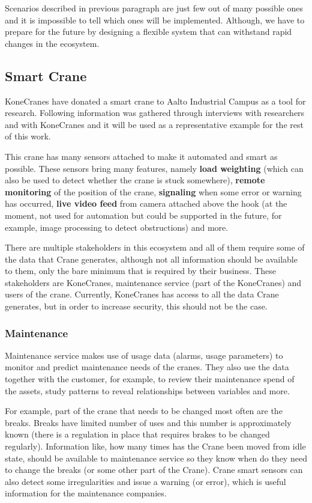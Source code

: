 Scenarios described in previous paragraph are just few out of many possible ones and it is impossible to tell which ones will be implemented. Although, we have to prepare for the future by designing a flexible system that can withstand rapid changes in the ecosystem.

\subsection{Smart Crane}

KoneCranes have donated a smart crane to Aalto Industrial Campus as a tool for research. Following information was gathered through interviews with researchers and with KoneCranes and it will be used as a representative example for the rest of this work.

This crane has many sensors attached to make it automated and smart as possible. These sensors
bring many features, namely {\bf load weighting} (which can also be used to detect
whether the crane is stuck somewhere), {\bf remote monitoring } of the position of the crane,
{\bf signaling} when some error or warning has occurred, {\bf live video feed } from camera attached
above the hook (at the moment, not used for automation but could be supported in the future,
for example, image processing to detect obstructions) and more.

There are multiple stakeholders in this ecosystem and all of them require some of the data
that Crane generates, although not all information should be available to them, only
the bare minimum that is required by their business. These stakeholders are KoneCranes, 
maintenance service (part of the KoneCranes) and users of the crane. Currently, KoneCranes has access to all the data Crane generates, but in order to 
increase security, this should not be the case.

\subsubsection{Maintenance}

Maintenance service makes use of usage data (alarms, usage parameters) to monitor and predict maintenance needs of the cranes. They also use the data together with the customer, for example, to review their maintenance spend of the assets, study patterns to reveal relationships between variables and more.

For example, part of the crane that needs to be changed most often are the breaks.
Breaks have limited number of uses and this number is approximately known
(there is a regulation in place that requires brakes to be changed regularly).
Information like, how many times has the Crane been moved from idle state,
should be available to maintenance service so they know when do they need to
change the breaks (or some other part of the Crane). Crane smart sensors can also 
detect some irregularities and issue a warning (or error),
which is useful information for the maintenance companies.

